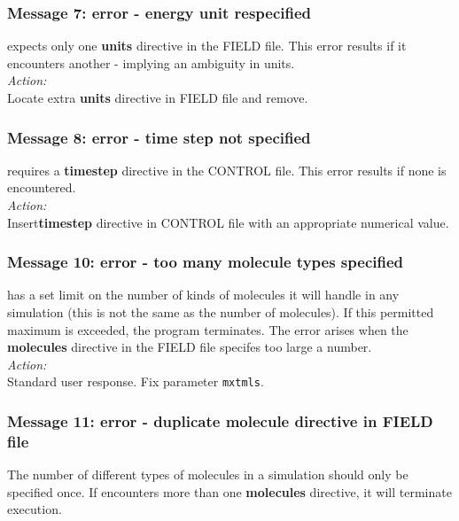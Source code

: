 \subsubsection*{Message 7: error - energy unit respecified}

\D{} expects only one {\bf units} directive in the FIELD file.
This error results if it encounters another - implying an ambiguity in
units. \\

\noindent
{\em Action:} \\ Locate extra {\bf units} directive in FIELD file and
remove.

\subsubsection*{Message 8: error - time step not specified}

\D{} requires a {\bf timestep} directive in the CONTROL file.
This error results if none is encountered.\\

\noindent
{\em Action:} \\ Insert{\bf timestep} directive in CONTROL file with
an appropriate numerical value.

\subsubsection*{Message 10: error - too many molecule types specified}

\D{} has a set limit on the number of kinds of molecules it will
handle in any simulation (this is not the same as the number of
molecules). If this permitted maximum is exceeded, the program
terminates. The error arises when the {\bf molecules} directive in the
FIELD file specifes too large a number.\\

\noindent
{\em Action:} \\ 
Standard user response. Fix parameter {\tt mxtmls}.

\subsubsection*{Message 11: error - duplicate molecule directive in
FIELD file}

The number of different types of molecules in a simulation should only
be specified once. If \D{} encounters more than one {\bf molecules}
directive, it will terminate execution.\\

